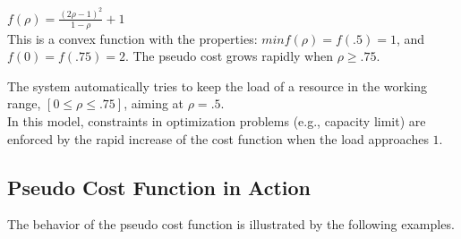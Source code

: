 \( f(\rho) = \frac{(2\rho - 1)^{2}}{1 - \rho} + 1  \) \\

This is a convex function with the properties:
$min f(\rho) = f(.5) = 1$, and $f(0) = f(.75) = 2$.
The pseudo cost grows rapidly when $\rho \ge .75$.

The system automatically tries to keep the load of a resource in the
working range, $[0 \le \rho \le .75]$, aiming at $\rho = .5$. \\

In this model, constraints in optimization problems (e.g.,
capacity limit) are enforced by the rapid increase of the cost function when
the load approaches $1$.

\subsection{Pseudo Cost Function in Action}

The behavior of the pseudo cost function is illustrated by the
following examples.

